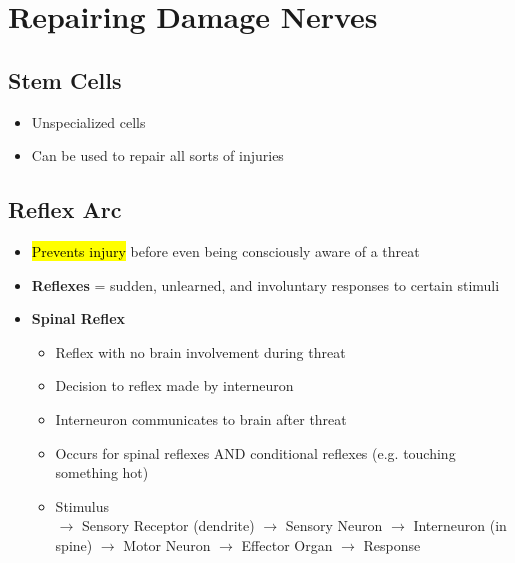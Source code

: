 \documentclass[a4paper,12pt]{article}
\begin{document}
\section{Repairing Damage Nerves}
\subsection{Stem Cells}
\begin{itemize}
    \item{Unspecialized cells}
    \item{Can be used to repair all sorts of injuries}
\end{itemize}

\subsection{Reflex Arc}
\begin{itemize}
    \item{\hl{Prevents injury} before even being consciously aware of a threat}
    \item{\textbf{Reflexes} = sudden, unlearned, and involuntary responses to certain stimuli}
    \item{
            \textbf{Spinal Reflex}
            \begin{itemize}
                \item{Reflex with no brain involvement during threat}
                \item{Decision to reflex made by interneuron}
                \item{Interneuron communicates to brain after threat}
                \item{Occurs for spinal reflexes AND conditional reflexes (e.g. touching something hot)}
                \item{Stimulus \\ $\longrightarrow$ Sensory Receptor (dendrite) $\longrightarrow$ Sensory Neuron $\longrightarrow$ Interneuron (in spine) $\longrightarrow$ Motor Neuron $\longrightarrow$ Effector Organ $\longrightarrow$ Response}
            \end{itemize}
        }
\end{itemize}
\end{document}
